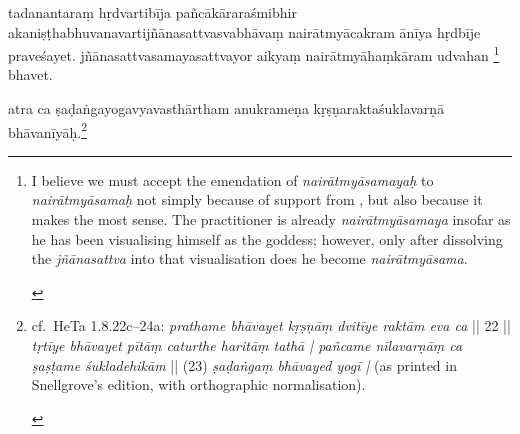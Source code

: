 \documentclass[naipra.tex]{subfiles}
\begin{document}
\begin{sanskrit}


\pstart
tadanantaraṃ hṛdvartibīja pañcākāraraśmibhir akaniṣṭhabhuvanavartijñānasattvasvabhāvaṃ nairātmyācakram ānīya hṛdbīje praveśayet.
jñānasattvasamayasattvayor aikyaṃ  nairātmyāhaṃkāram udvahan \footnote{\begin{english}
	I believe we must accept the emendation of \emph{nairātmyāsamayaḥ} to \emph{nairātmyāsamaḥ} not simply because of support from \TIB , but also because it makes the most sense.
	The practitioner is already \emph{nairātmyāsamaya} insofar as he has been visualising himself as the goddess; however, only after dissolving the \emph{jñānasattva} into that visualisation does he become \emph{nairātmyāsama}.
\end{english}} bhavet. 
\pend


\pstart
atra ca ṣaḍaṅgayogavyavasthārtham anukrameṇa kṛṣṇaraktaśuklavarṇā bhāvanīyāḥ.\footnote{\begin{english}
	cf.\ HeTa 1.8.22c–24a: \emph{prathame bhāvayet kṛṣṇāṃ dvitīye raktām eva ca} || 22 || \emph{tṛtīye bhāvayet pītāṃ caturthe haritāṃ tathā | pañcame nīlavarṇāṃ ca ṣaṣṭame śukladehikām }|| (23) \emph{ṣaḍaṅgaṃ bhāvayed yogī |} (as printed in Snellgrove's edition, with orthographic normalisation).
\end{english}} 
\pend


\end{sanskrit}
\end{document}
